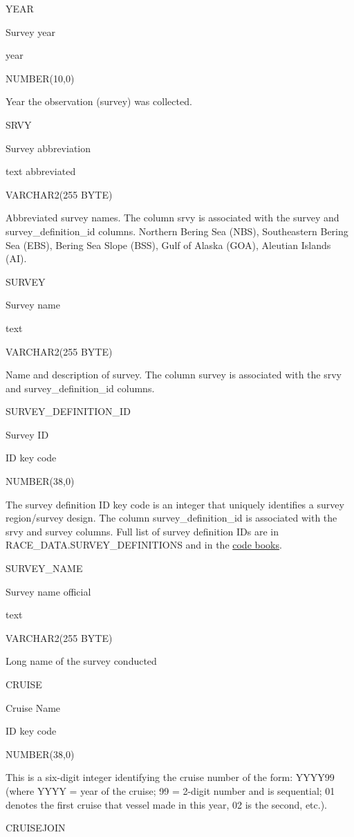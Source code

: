 \documentclass[
  letterpaper,
  oneside,
  open=any]{scrbook}
\begin{document}
YEAR

Survey year

year

NUMBER(10,0)

Year the observation (survey) was collected.

SRVY

Survey abbreviation

text abbreviated

VARCHAR2(255 BYTE)

Abbreviated survey names. The column srvy is associated with the survey
and survey\_definition\_id columns. Northern Bering Sea (NBS),
Southeastern Bering Sea (EBS), Bering Sea Slope (BSS), Gulf of Alaska
(GOA), Aleutian Islands (AI).

SURVEY

Survey name

text

VARCHAR2(255 BYTE)

Name and description of survey. The column survey is associated with the
srvy and survey\_definition\_id columns.

SURVEY\_DEFINITION\_ID

Survey ID

ID key code

NUMBER(38,0)

The survey definition ID key code is an integer that uniquely identifies
a survey region/survey design. The column survey\_definition\_id is
associated with the srvy and survey columns. Full list of survey
definition IDs are in RACE\_DATA.SURVEY\_DEFINITIONS and in the
\href{https://www.fisheries.noaa.gov/resource/document/groundfish-survey-species-code-manual-and-data-codes-manual}{code
books}.

SURVEY\_NAME

Survey name official

text

VARCHAR2(255 BYTE)

Long name of the survey conducted

CRUISE

Cruise Name

ID key code

NUMBER(38,0)

This is a six-digit integer identifying the cruise number of the form:
YYYY99 (where YYYY = year of the cruise; 99 = 2-digit number and is
sequential; 01 denotes the first cruise that vessel made in this year,
02 is the second, etc.).

CRUISEJOIN
\end{document}
